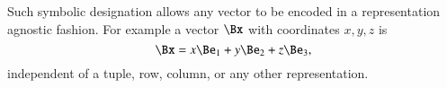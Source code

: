 Such symbolic designation allows any vector to be encoded in a
representation agnostic fashion.  For example a vector \( \Bx \) with coordinates \( x, y, z \) is
\begin{equation}\label{eqn:prerequisites:40}
\Bx = x \Be_1 + y \Be_2 + z \Be_3,
\end{equation}
independent of a tuple, row, column, or any other representation.
